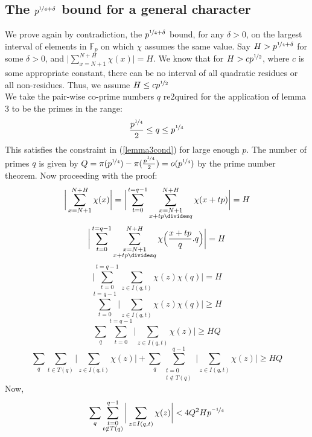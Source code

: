 \documentclass{report}
\begin{document}
\subsection{The $p^{\nicefrac{1}{4}+\delta}$ bound for a general character}
We prove again by contradiction, the $p^{\nicefrac{1}{4}+\delta}$ bound, for any $\delta>0$, on the largest interval of elements in $\mathbb{F}_p$ on which $\chi$ assumes the same value. Say $H>p^{\nicefrac{1}{4}+\delta}$ for some $\delta>0$, and $\Big \lvert \sum\limits_{x=N+1}^{N+H}\chi(x)\Big \rvert=H$. We know that for $H>cp^{\nicefrac{1}{2}}$, where $c$ is some appropriate constant, there can be no interval of all quadratic residues or all non-residues. Thus, we assume $H\leq cp^{\nicefrac{1}{2}}$\\
We take the pair-wise co-prime numbers $q$ re2quired for the application of lemma 3 to be the primes in the range:
$$\frac{p^{\nicefrac{1}{4}}}{2} \leq q \leq p^{\nicefrac{1}{4}}$$
This satisfies the constraint in (\ref{lemma3cond}) for large enough $p$. The number of primes $q$ is given by $Q=\pi(p^{\nicefrac{1}{4}})-\pi(\frac{p^{\nicefrac{1}{4}}}{2})=o(p^{\nicefrac{1}{4}})$ by the prime number theorem. Now proceeding with the proof:
\[\bigg \lvert\sum\limits_{x=N+1}^{N+H}\chi(x)\bigg \rvert=\bigg \lvert\sum\limits_{t=0}^{t=q-1}\sum\limits_{\substack{x=N+1\\x+tp\divides q}}^{N+H}\chi(x+tp)\bigg \rvert=H \]
$$\bigg \lvert\sum\limits_{t=0}^{t=q-1}\sum\limits_{\substack{x=N+1\\x+tp\divides q}}^{N+H} \chi \Big(\frac{x+tp}{q}.q\Big)\bigg \rvert=H$$
$$\bigg \lvert\sum\limits_{t=0}^{t=q-1}\sum\limits_{z\in I(q,t)}\chi(z)\chi(q)\bigg \rvert=H$$
$$\sum\limits_{t=0}^{t=q-1}\bigg \lvert\sum\limits_{z\in I(q,t)}\chi(z)\chi(q)\bigg \rvert \geq H$$
$$\sum_q\sum\limits_{t=0}^{t=q-1}\bigg \lvert\sum\limits_{z\in I(q,t)}\chi(z)\bigg \rvert \geq HQ$$
\begin{equation} \label{seperationgen}
\sum_q\sum\limits_{t\in T(q)}\bigg \lvert\sum\limits_{z\in I(q,t)}\chi(z)\bigg \rvert+\sum_q\sum\limits_{\substack{t=0\\t\not \in T(q)}}^{q-1}\bigg \lvert\sum\limits_{z\in I(q,t)}\chi(z)\bigg \rvert \geq HQ
\end{equation}
Now,
\begin{equation} \label{overlappinggen}
\sum_q\sum\limits_{\substack{t=0\\t\not \in T(q)}}^{q-1}\bigg\lvert\sum\limits_{z\in I(q,t) }\chi(z)\bigg \rvert < 4Q^2 Hp^{\nicefrac{-1}{4}}
\end{equation}
\end{document}
